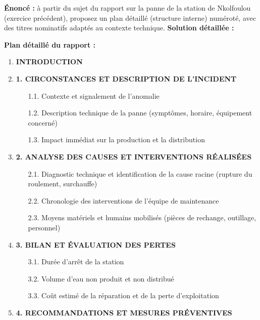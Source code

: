 \documentclass[11pt]{article}
\begin{document}
\begin{exoresolu}
    \textbf{Énoncé :} à partir du sujet du rapport sur la panne de la station de Nkolfoulou (exercice précédent), proposez un plan détaillé (structure interne) numéroté, avec des titres nominatifs adaptés au contexte technique.
    \tcblower
    \textbf{Solution détaillée :}

    \textbf{Plan détaillé du rapport :}
    \begin{enumerate}
        \item \textbf{INTRODUCTION}
        \item \textbf{1. CIRCONSTANCES ET DESCRIPTION DE L'INCIDENT}
              \begin{enumerate}
                  \item[1.1.] Contexte et signalement de l'anomalie
                  \item[1.2.] Description technique de la panne (symptômes, horaire, équipement concerné)
                  \item[1.3.] Impact immédiat sur la production et la distribution
              \end{enumerate}
        \item \textbf{2. ANALYSE DES CAUSES ET INTERVENTIONS RÉALISÉES}
              \begin{enumerate}
                  \item[2.1.] Diagnostic technique et identification de la cause racine (rupture du roulement, surchauffe)
                  \item[2.2.] Chronologie des interventions de l'équipe de maintenance
                  \item[2.3.] Moyens matériels et humains mobilisés (pièces de rechange, outillage, personnel)
              \end{enumerate}
        \item \textbf{3. BILAN ET ÉVALUATION DES PERTES}
              \begin{enumerate}
                  \item[3.1.] Durée d'arrêt de la station
                  \item[3.2.] Volume d'eau non produit et non distribué
                  \item[3.3.] Coût estimé de la réparation et de la perte d'exploitation
              \end{enumerate}
        \item \textbf{4. RECOMMANDATIONS ET MESURES PRÉVENTIVES}

\end{enumerate}
\end{exoresolu}
\end{document}
